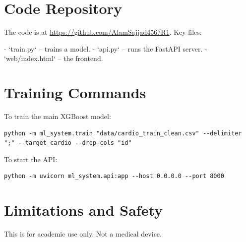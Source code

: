 \documentclass[11pt, a4paper, oneside]{book}
\begin{document}
\section{Code Repository}
The code is at \url{https://github.com/AlamSajjad456/R1}. Key files:

- `train.py` – trains a model.
- `api.py` – runs the FastAPI server.
- `web/index.html` – the frontend.

\section{Training Commands}
To train the main XGBoost model:
\begin{verbatim}
python -m ml_system.train "data/cardio_train_clean.csv" --delimiter ";" --target cardio --drop-cols "id"
\end{verbatim}

To start the API:
\begin{verbatim}
python -m uvicorn ml_system.api:app --host 0.0.0.0 --port 8000
\end{verbatim}

\section{Limitations and Safety}
This is for academic use only. Not a medical device.
\end{document}
